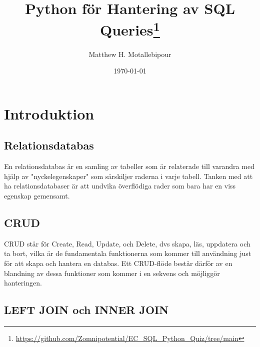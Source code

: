 \documentclass[10pt]{article}
\begin{document}

\title{Python för Hantering av SQL Queries\footnote{\href{https://github.com/Zomnipotential/EC\_SQL\_Python\_Quiz/tree/main}{https://github.com/Zomnipotential/EC\_SQL\_Python\_Quiz/tree/main}}}
\author{Matthew H. Motallebipour}
\date{\today}
\maketitle

\section{Introduktion}

\subsection{Relationsdatabas}

En relationsdatabas är en samling av tabeller som är relaterade till varandra med hjälp av "nyckelegenskaper" som särskiljer raderna i varje tabell. Tanken med att ha relationsdatabaser är att undvika överflödiga rader som bara har en viss egenskap gemensamt.


\subsection{CRUD}

CRUD står för Create, Read, Update, och Delete, dvs skapa, läs, uppdatera och ta bort, vilka är de fundamentala funktionerna som kommer till användning just för att skapa och hantera en databas. Ett CRUD-flöde består därför av en blandning av dessa funktioner som kommer i en sekvens och möjliggör hanteringen.



\subsection{LEFT JOIN och INNER JOIN}
\end{document}

